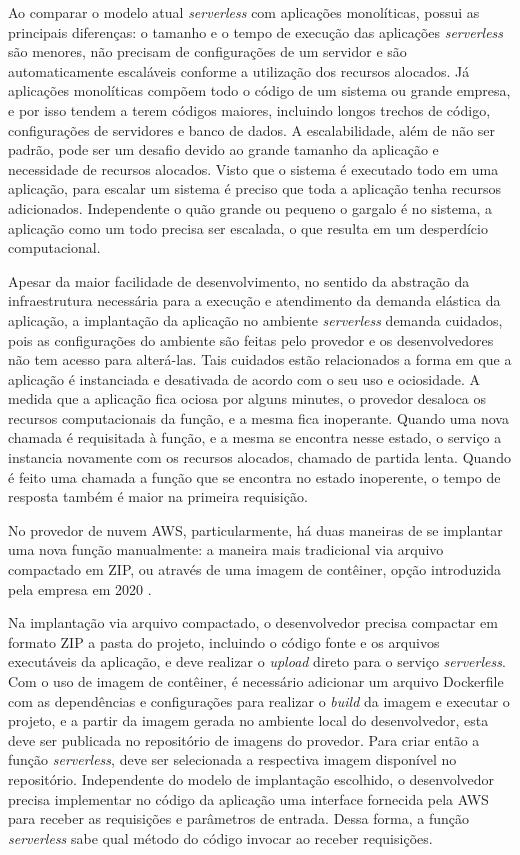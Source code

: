 \documentclass[conference]{IEEEtran}
\begin{document}
Ao comparar o modelo atual \textit{serverless} com aplicações monolíticas, possui as principais diferenças: o tamanho e o tempo de execução das aplicações \textit{serverless} são menores, não precisam de configurações de um servidor e são automaticamente escaláveis conforme a utilização dos recursos alocados. Já aplicações monolíticas compõem todo o código de um sistema ou grande empresa, e por isso tendem a terem códigos maiores, incluindo longos trechos de código, configurações de servidores e banco de dados. A escalabilidade, além de não ser padrão, pode ser um desafio devido ao grande tamanho da aplicação e necessidade de recursos alocados. Visto que o sistema é executado todo em uma aplicação, para escalar um sistema é preciso que toda a aplicação tenha recursos adicionados. Independente o quão grande ou pequeno o gargalo é no sistema, a aplicação como um todo precisa ser escalada, o que resulta em um desperdício computacional.

Apesar da maior facilidade de desenvolvimento, no sentido da abstração da infraestrutura necessária para a execução e atendimento da demanda elástica da aplicação, a implantação da aplicação no ambiente \textit{serverless} demanda cuidados, pois as configurações do ambiente são feitas pelo provedor e os desenvolvedores não tem acesso para alterá-las. Tais cuidados estão relacionados a forma em que a aplicação é instanciada e desativada de acordo com o seu uso e ociosidade. A medida que a aplicação fica ociosa por alguns minutes, o provedor desaloca os recursos computacionais da função, e a mesma fica inoperante. Quando uma nova chamada é requisitada à função, e a mesma se encontra nesse estado, o serviço a instancia novamente com os recursos alocados, chamado de partida lenta. Quando é feito uma chamada a função que se encontra no estado inoperente, o tempo de resposta também é maior na primeira requisição.   

No provedor de nuvem AWS, particularmente, há duas maneiras de se implantar uma nova função manualmente: a maneira mais tradicional via arquivo compactado em ZIP, ou através de uma imagem de contêiner, opção introduzida pela empresa em 2020 \cite{aws_2020_supports_container_image}.

Na implantação via arquivo compactado, o desenvolvedor precisa compactar em formato ZIP a pasta do projeto, incluindo o código fonte e os arquivos executáveis da aplicação, e deve realizar o \textit{upload} direto para o serviço \textit{serverless}. Com o uso de imagem de contêiner, é necessário adicionar um arquivo Dockerfile com as dependências e configurações para realizar o \textit{build} da imagem e executar o projeto, e a partir da imagem gerada no ambiente local do desenvolvedor, esta deve ser publicada no repositório de imagens do provedor. Para criar então a  função \textit{serverless}, deve ser selecionada a respectiva imagem disponível no repositório. 
Independente do modelo de implantação escolhido, o desenvolvedor precisa implementar no código da aplicação uma interface fornecida pela AWS para receber as requisições e parâmetros de entrada. Dessa forma, a função \textit{serverless} sabe qual método do código invocar ao receber requisições.
\end{document}
